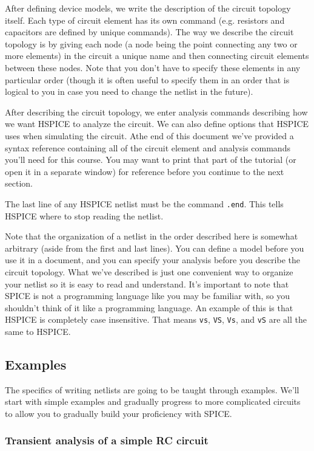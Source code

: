 \documentclass{article}
\begin{document}
After defining device models, we write the description of the circuit topology itself. Each type of circuit element has its own command (e.g. resistors and capacitors are defined by unique commands). The way we describe the circuit topology is by giving each node (a node being the point connecting any two or more elements) in the circuit a unique name and then connecting circuit elements between these nodes. Note that you don't have to specify these elements in any particular order (though it is often useful to specify them in an order that is logical to you in case you need to change the netlist in the future).

After describing the circuit topology, we enter analysis commands describing how we want HSPICE to analyze the circuit. We can also define options that HSPICE uses when simulating the circuit. Athe end of this document we've provided a syntax reference containing all of the circuit element and analysis commands you'll need for this course. You may want to print that part of the tutorial (or open it in a separate window) for reference before you continue to the next section.

The last line of any HSPICE netlist must be the command \verb|.end|. This tells HSPICE where to stop reading the netlist.

Note that the organization of a netlist in the order described here is somewhat arbitrary (aside from the first and last lines). You can define a model before you use it in a document, and you can specify your analysis before you describe the circuit topology. What we've described is just one convenient way to organize your netlist so it is easy to read and understand. It's important to note that SPICE is not a programming language like you may be familiar with, so you shouldn't think of it like a programming language. An example of this is that HSPICE is completely case insensitive. That means \verb|vs|, \verb|VS|, \verb|Vs|, and \verb|vS| are all the same to HSPICE.

\subsection{Examples}

The specifics of writing netlists are going to be taught through examples. We'll start with simple examples and gradually progress to more complicated circuits to allow you to gradually build your proficiency with SPICE.

\subsubsection{Transient analysis of a simple RC circuit}
\end{document}
